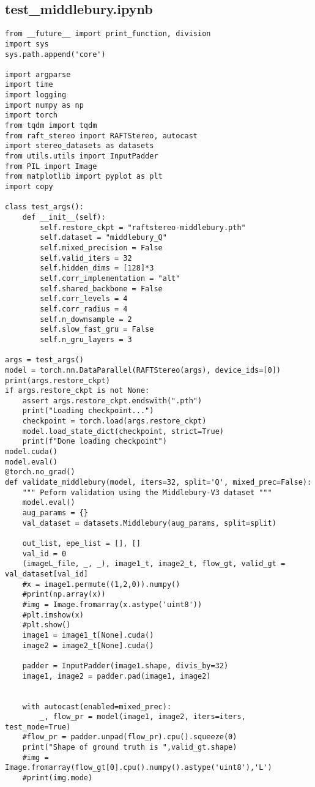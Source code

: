\subsection*{test_middlebury.ipynb}
\begin{lstlisting}
from __future__ import print_function, division
import sys
sys.path.append('core')

import argparse
import time
import logging
import numpy as np
import torch
from tqdm import tqdm
from raft_stereo import RAFTStereo, autocast
import stereo_datasets as datasets
from utils.utils import InputPadder
from PIL import Image
from matplotlib import pyplot as plt
import copy

class test_args():
    def __init__(self):
        self.restore_ckpt = "raftstereo-middlebury.pth"
        self.dataset = "middlebury_Q"
        self.mixed_precision = False
        self.valid_iters = 32
        self.hidden_dims = [128]*3
        self.corr_implementation = "alt"
        self.shared_backbone = False
        self.corr_levels = 4
        self.corr_radius = 4
        self.n_downsample = 2
        self.slow_fast_gru = False
        self.n_gru_layers = 3

args = test_args()
model = torch.nn.DataParallel(RAFTStereo(args), device_ids=[0])
print(args.restore_ckpt)
if args.restore_ckpt is not None:
    assert args.restore_ckpt.endswith(".pth")
    print("Loading checkpoint...")
    checkpoint = torch.load(args.restore_ckpt)
    model.load_state_dict(checkpoint, strict=True)
    print(f"Done loading checkpoint")
model.cuda()
model.eval()
@torch.no_grad()
def validate_middlebury(model, iters=32, split='Q', mixed_prec=False):
    """ Peform validation using the Middlebury-V3 dataset """
    model.eval()
    aug_params = {}
    val_dataset = datasets.Middlebury(aug_params, split=split)

    out_list, epe_list = [], []
    val_id = 0
    (imageL_file, _, _), image1_t, image2_t, flow_gt, valid_gt = val_dataset[val_id]
    #x = image1.permute((1,2,0)).numpy()
    #print(np.array(x))
    #img = Image.fromarray(x.astype('uint8'))
    #plt.imshow(x)
    #plt.show()
    image1 = image1_t[None].cuda()
    image2 = image2_t[None].cuda()

    padder = InputPadder(image1.shape, divis_by=32)
    image1, image2 = padder.pad(image1, image2)


    with autocast(enabled=mixed_prec):
        _, flow_pr = model(image1, image2, iters=iters, test_mode=True)
    #flow_pr = padder.unpad(flow_pr).cpu().squeeze(0)
    print("Shape of ground truth is ",valid_gt.shape)
    #img = Image.fromarray(flow_gt[0].cpu().numpy().astype('uint8'),'L')
    #print(img.mode)


\end{lstlisting}
